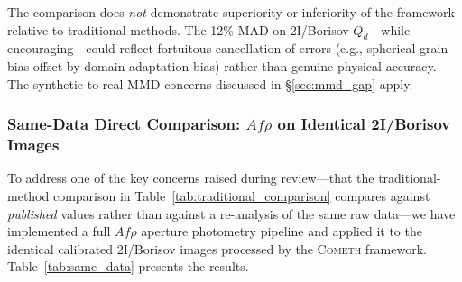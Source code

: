 \documentclass[usenatbib]{mnras}
\begin{document}
The comparison does \textit{not} demonstrate superiority or inferiority of the framework relative to traditional methods. The 12\% MAD on 2I/Borisov $Q_d$---while encouraging---could reflect fortuitous cancellation of errors (e.g., spherical grain bias offset by domain adaptation bias) rather than genuine physical accuracy. The synthetic-to-real MMD concerns discussed in \S\ref{sec:mmd_gap} apply.

\subsubsection{Same-Data Direct Comparison: $Af\rho$ on Identical 2I/Borisov Images}\label{sec:same_data}

To address one of the key concerns raised during review---that the traditional-method comparison in Table~\ref{tab:traditional_comparison} compares against \textit{published} values rather than against a re-analysis of the same raw data---we have implemented a full $Af\rho$ aperture photometry pipeline and applied it to the identical calibrated 2I/Borisov images processed by the \textsc{Cometh} framework. Table~\ref{tab:same_data} presents the results.
\end{document}
